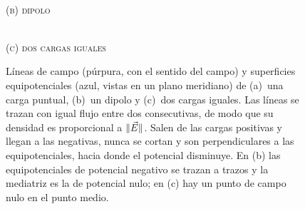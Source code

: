 \begin{figure}[ht]
{\begin{minipage}[t]{0.32\textwidth}
\\[2pt]{\small\scshape (b)\; dipolo}
\end{minipage}\hfill
\begin{minipage}[t]{0.32\textwidth}\centering
{}\\[2pt]{\small\scshape (c)\; dos cargas iguales}
\end{minipage}
}%
\caption{Líneas de campo (púrpura, con el sentido del campo) y superficies equipotenciales (azul, vistas en
un plano meridiano) de (a)~una carga puntual, (b)~un dipolo y (c)~dos cargas iguales. Las líneas se trazan con
igual flujo entre dos consecutivas, de modo que su densidad es proporcional a $\lVert \vec{E}\rVert$. Salen de las cargas
positivas y llegan a las negativas, nunca se cortan y son perpendiculares a las equipotenciales, hacia donde
el potencial disminuye. En (b) las equipotenciales de potencial negativo se trazan a trazos y la mediatriz es la
de potencial nulo; en (c) hay un punto de campo nulo en el punto medio.}
\label{fig:lineas}
\end{figure}
